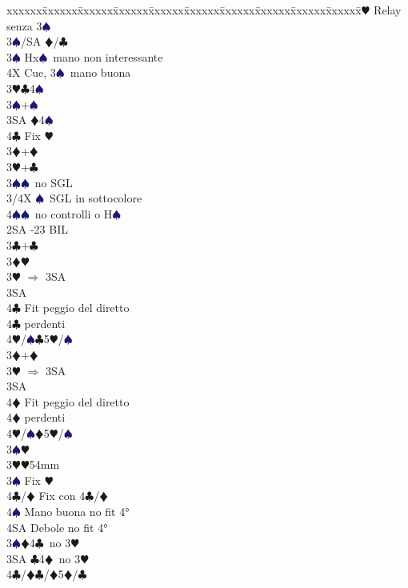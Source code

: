 \documentclass[a4paper,italian]{article}
\newcommand{\BC}{\textcolor{OliveGreen}{$\clubsuit$}}
\newcommand{\BD}{\textcolor{RedOrange}{$\vardiamondsuit$}}
\newcommand{\BH}{\textcolor{Red2}{$\varheartsuit${}}}
\newcommand{\BS}{\textcolor{MidnightBlue}{$\spadesuit${}}}
\newenvironment{bidtable}
{\begin{tabbing}

    xxxxxx\=xxxxxx\=xxxxxx\=xxxxxx\=xxxxxx\=xxxxxx\=xxxxxx\=xxxxxx\=xxxxxx\=xxxxxx\=\kill}
{\end{tabbing} }%
\begin{document}
\begin{multicols}{2}
\begin{bidtable}
        3\BH \> Relay senza 3\BS\+\\
        3\BS/SA \BD/\BC\-\\
        3\BS \> Hx\BS\ mano non interessante\\
        4X \> Cue, 3\BS\ mano buona\-\\
        3\BH {}\BC 4\BS \\
        3\BS {}+\BS \\
        3SA \BD 4\BS \\
        4\BC \> Fix \BH \-\\
        3\BD {}+\BD \\
        3\BH {}+\BC \\
        3\BS {}\BS\ no SGL\\
        3/4X \BS\ SGL in sottocolore\\
        4\BS {}\BS\ no controlli o H\BS \-\\
        2SA -23 BIL\\
        3\BC {}+\BC \+\\
        3\BD {}\BH \\
        3\BH \> $\Rightarrow$ 3SA\+\\
        3SA\+\\
        4\BC \> Fit peggio del diretto\-\\
        4\BC {} perdenti\\
        4\BH/\BS {}\BC 5\BH /\BS \-\-\\
        3\BD {}+\BD \+\\
        3\BH \> $\Rightarrow$ 3SA\+\\
        3SA\+\\
        4\BD \> Fit peggio del diretto\-\\
        4\BD {} perdenti\\
        4\BH/\BS {}\BD 5\BH /\BS \-\\
        3\BS {}\BH \-\\
        3\BH {}\BH 54mm\+\\
        3\BS \> Fix \BH \\
        4\BC/\BD \> Fix con 4\BC/\BD\\
        4\BS \> Mano buona no fit 4°\\
        4SA \> Debole no fit 4°\-\\
        3\BS {}\BD 4\BC\ no 3\BH \\
        3SA \BC 4\BD\ no 3\BH \\
        4\BC/\BD {}\BC /\BD 5\BD /\BC\\

\end{bidtable}
\end{multicols}
\end{document}

